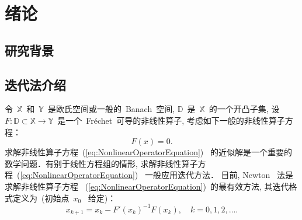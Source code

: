 

\chapter{绪论}
\label{chapter:Introduction}


\section{研究背景}











\section{迭代法介绍}

令~$\mathbb{X}$~和~$\mathbb{Y}$~是欧氏空间或一般的~Banach~空间,
$\mathbb{D}$~是~$\mathbb{X}$~的一个开凸子集, 设~$F:\mathbb{D}
\subset \mathbb{X} \to
\mathbb{Y}$~是一个~Fr\'{e}chet~可导的非线性算子,
考虑如下一般的非线性算子方程：
\begin{equation}
\label{eq:NonlinearOperatorEquation} F(x) = 0.
\end{equation}
求解非线性算子方程~(\ref{eq:NonlinearOperatorEquation})~
的近似解是一个重要的数学问题．有别于线性方程组的情形,
求解非线性算子方程~(\ref{eq:NonlinearOperatorEquation})~
一般应用迭代方法． 目前, Newton~ 法是求解非线性算子方程
~(\ref{eq:NonlinearOperatorEquation})~的最有效方法,
其迭代格式定义为~(初始点~$x_0$~ 给定)：
\begin{equation}
\label{it:NM_BanachSpace} x_{k+1} = x_k - F'(x_k)^{-1}F(x_k),\quad k
= 0,1,2,\ldots.
\end{equation}


